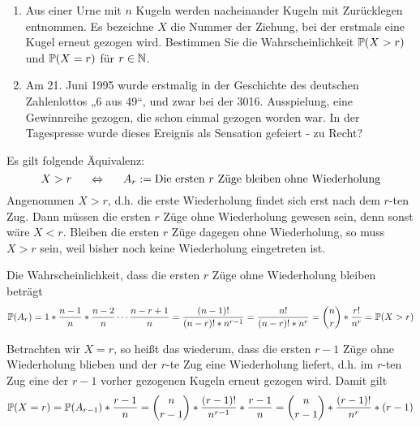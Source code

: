 \begin{exercisePage}
	

	\begin{exercise}
		\begin{enumerate}[leftmargin=*,label=(\alph*)]
			\item Aus einer Urne mit $n$ Kugeln werden nacheinander Kugeln mit Zurücklegen entnommen. Es bezeichne $X$ die Nummer der Ziehung, bei der erstmals eine Kugel erneut gezogen wird. Bestimmen Sie die Wahrscheinlichkeit $\P(X > r)$ und $\P(X = r)$ für $r \in \N$.
			\item Am 21. Juni 1995 wurde erstmalig in der Geschichte des deutschen Zahlenlottos „6 aus 49“, und zwar bei der 3016. Ausspielung, eine Gewinnreihe gezogen, die schon einmal gezogen worden war. In der Tagespresse wurde dieses Ereignis als Sensation gefeiert - zu Recht?
		\end{enumerate}
	\end{exercise}

	Es gilt folgende Äquivalenz:
	\begin{equation*}
		X > r \quad \equivalent \quad A_r \defeq \text{Die ersten $r$ Züge bleiben ohne Wiederholung}
	\end{equation*}
	Angenommen $X>r$, d.h. die erste Wiederholung findet sich erst nach dem $r$-ten Zug. Dann müssen die ersten $r$ Züge ohne Wiederholung gewesen sein, denn sonst wäre $X<r$. Bleiben die ersten $r$ Züge dagegen ohne Wiederholung, so muss $X>r$ sein, weil bisher noch keine Wiederholung eingetreten ist.
	
	Die Wahrscheinlichkeit, dass die ersten $r$ Züge ohne Wiederholung bleiben beträgt
	\begin{equation*}
		\P(A_r) = 1 * \frac{n-1}{n} * \frac{n-2}{n} \cdots \frac{n-r + 1}{n} = \frac{(n-1)!}{(n-r)! * n^{r-1}} =\frac{n!}{(n-r)! * n^r} = \binom{n}{r} * \frac{r!}{n^r} = \P(X>r)
	\end{equation*}
	
	Betrachten wir $X=r$, so heißt das wiederum, dass die ersten $r-1$ Züge ohne Wiederholung blieben und der $r$-te Zug eine Wiederholung liefert, d.h. im $r$-ten Zug eine der $r-1$ vorher gezogenen Kugeln erneut gezogen wird. Damit gilt
	\begin{equation*}
		\P(X=r) = \P(A_{r-1}) * \frac{r-1}{n} 
		= \binom{n}{r-1} * \frac{(r-1)!}{n^{r-1}} * \frac{r-1}{n} 
		= \binom{n}{r-1} * \frac{(r-1)!}{n^r} * (r-1)
	\end{equation*}
	

\end{exercisePage}
